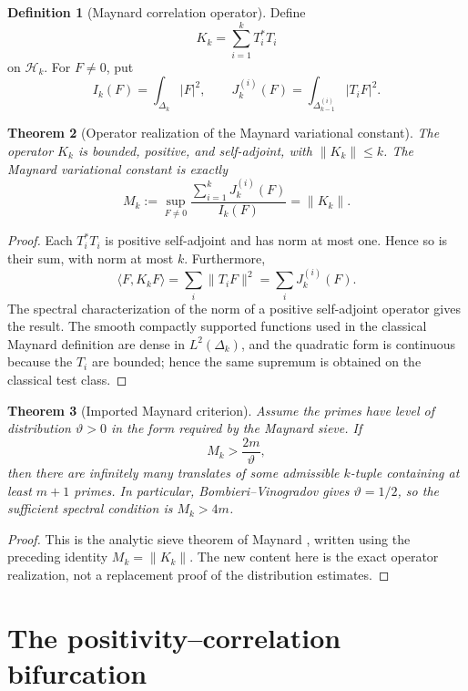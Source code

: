 \documentclass[11pt]{article}
\newtheorem{theorem}{Theorem}[section]
\theoremstyle{definition}
\newtheorem{definition}[theorem]{Definition}
\theoremstyle{remark}
\newcommand{\HH}{\mathcal H}
\newcommand{\1}{\mathbf 1}
\begin{document}
\begin{definition}[Maynard correlation operator]
Define
\[
K_k=\sum_{i=1}^kT_i^*T_i
\]
on $\HH_k$.  For $F\neq0$, put
\[
I_k(F)=\int_{\Delta_k}|F|^2,
\qquad
J_k^{(i)}(F)=\int_{\Delta_{k-1}^{(i)}}|T_iF|^2.
\]
\end{definition}

\begin{theorem}[Operator realization of the Maynard variational constant]
The operator $K_k$ is bounded, positive, and self-adjoint, with $\|K_k\|\leq k$.  The Maynard variational constant is exactly
\[
M_k
:=
\sup_{F\neq0}
\frac{\sum_{i=1}^kJ_k^{(i)}(F)}{I_k(F)}
=
\|K_k\|.
\]
\end{theorem}

\begin{proof}
Each $T_i^*T_i$ is positive self-adjoint and has norm at most one.  Hence so is their sum, with norm at most $k$.  Furthermore,
\[
\langle F,K_kF\rangle
=
\sum_i\|T_iF\|^2
=
\sum_iJ_k^{(i)}(F).
\]
The spectral characterization of the norm of a positive self-adjoint operator gives the result.  The smooth compactly supported functions used in the classical Maynard definition are dense in $L^2(\Delta_k)$, and the quadratic form is continuous because the $T_i$ are bounded; hence the same supremum is obtained on the classical test class.
\end{proof}

\begin{theorem}[Imported Maynard criterion]
Assume the primes have level of distribution $\vartheta>0$ in the form required by the Maynard sieve.  If
\[
M_k>\frac{2m}{\vartheta},
\]
then there are infinitely many translates of some admissible $k$-tuple containing at least $m+1$ primes.  In particular, Bombieri--Vinogradov gives $\vartheta=1/2$, so the sufficient spectral condition is $M_k>4m$.
\end{theorem}

\begin{proof}
This is the analytic sieve theorem of Maynard \cite{Maynard2015}, written using the preceding identity $M_k=\|K_k\|$.  The new content here is the exact operator realization, not a replacement proof of the distribution estimates.
\end{proof}

\section{The positivity--correlation bifurcation}
\end{document}

